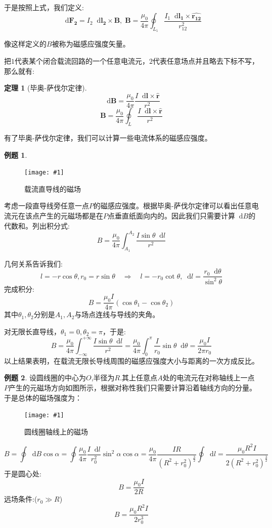 \documentclass[12pt,a4paper,oneside]{report}
\newtheorem{theorem}{定理}[chapter]
\theoremstyle{definition}
\newtheorem{example}{例题}[chapter]
\theoremstyle{remark}
\newcommand{\insertfig}[3]{
    \begin{figure}[ht]
        \centering
        \texttt{[image: \#1]}
        \caption{#2}
        \label{fig:#1}
    \end{figure}
}
\renewcommand{\d}{\mathop{}\!\mathrm{d}}
\begin{document}
于是按照上式，我们定义:
\[
\d \mathbf{F_2} = I_2\d \mathbf{l_2}\times \mathbf{B}, \; \mathbf{B} = \frac{\mu_0}{4\pi}\oint_{L_1}\frac{I_1 \d \mathbf{l_1}\times {\mathbf{\hat{r_{12}}}}}{r^2_{12}}
\]

像这样定义的$B$被称为磁感应强度矢量。

把$1$代表某个闭合载流回路的一个任意电流元，$2$代表任意场点并且略去下标不写，那么就有:
\begin{theorem}[毕奥-萨伐尔定律]
\[
\d \mathbf{B}=  \frac{\mu_0}{4\pi}
\frac{I \d \mathbf{l}\times {\mathbf{\hat{r}}}}{r^2}
\]
\[
\mathbf{B} = \frac{\mu_0}{4\pi}
\oint_L \frac{I \d \mathbf{l}\times {\mathbf{\hat{r}}}}{r^2}
\]
\end{theorem}

有了毕奥-萨伐尔定律，我们可以计算一些电流体系的磁感应强度。

\begin{example}
  \insertfig{2-2.png}{载流直导线的磁场}{0.25}
考虑一段直导线旁任意一点$P$的磁感应强度。根据毕奥-萨伐尔定律可以看出任意电流元在该点产生的元磁场都是在$P$点垂直纸面向内的。因此我们只需要计算$\d B$的代数和。列出积分式:
\[
B = \frac{\mu_0}{4\pi}\int_{A_1}^{A_2}\frac{I\sin\theta\d l}{r^2}
\]

几何关系告诉我们:
\[
l=-r\cos\theta,r_0=r\sin\theta\quad\Rightarrow\quad l=-r_0\cot\theta,\d l = \frac{r_0 \d\theta}{\sin^2\theta}
\]
完成积分:
\[
B = \frac{\mu_0 I}{4\pi}(\cos\theta_1-\cos\theta_2)
\]
其中$\theta_1,\theta_2$分别是$A_1,A_2$与场点连线与导线的夹角。

对无限长直导线，$\theta_1=0,\theta_2=\pi$，于是:
\[
B = \frac{\mu_0}{4\pi}\int_{-\infty}^{+\infty}\frac{I\sin\theta\d l}{r^2}=\frac{\mu_0}{4\pi}\int_0^\pi\frac{I}{r_0}\sin \theta\d\theta=\frac{\mu_0 I}{2\pi r_0}
\]
以上结果表明，在载流无限长导线周围的磁感应强度大小与距离的一次方成反比。

\end{example}

\begin{example}
设圆线圈的中心为$O$,半径为$R$.其上任意点$A$处的电流元在对称轴线上一点$P$产生的元磁场方向如图所示，根据对称性我们只需要计算沿着轴线方向的分量。于是总体的磁场强度为：

\insertfig{2-3.png}{圆线圈轴线上的磁场}{0.25}
\[
B=\oint\d B \cos \alpha =\oint \frac{\mu_0}{4\pi} \frac{I\d l}{r_0^2}\sin^2\alpha\cos\alpha = \frac{\mu_0}{4\pi}\frac{IR}{(R^2+r_0^2)^{\frac{3}{2}}}\oint \d l =\frac{\mu_0R^2I}{2(R^2+r_0^2)^{\frac{3}{2}}}
\]
于是圆心处:
\[
B=\frac{\mu_0 I}{2R}
\]
远场条件:($r_0 \gg R$)
\[
B=\frac{\mu_0R^2I}{2r_0^3}
\]
\end{example}
\end{document}

